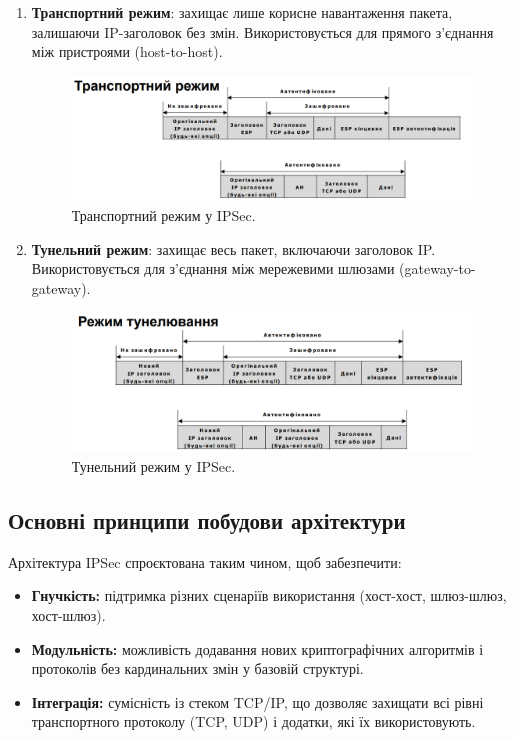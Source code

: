 \begin{enumerate}
    \item \textbf{Транспортний режим}: захищає лише корисне навантаження пакета, залишаючи IP-заголовок без змін. Використовується для прямого з’єднання між пристроями (host-to-host).

    \begin{figure}[h!]
        \centering
        \includegraphics[scale=0.35]{IMAGES/transport_mode.png}
        \caption{Транспортний режим у IPSec.}
        \label{fig_transport_mode}
    \end{figure}
    
    \item \textbf{Тунельний режим}: захищає весь пакет, включаючи заголовок IP. Використовується для з’єднання між мережевими шлюзами (gateway-to-gateway).

    \begin{figure}[h!]
        \centering
        \includegraphics[scale=0.35]{IMAGES/tunnel_mode.png}
        \caption{Тунельний режим у IPSec.}
        \label{fig_tunnel_mode}
    \end{figure}

\end{enumerate}

\subsection{Основні принципи побудови архітектури}
Архітектура IPSec спроєктована таким чином, щоб забезпечити:
\begin{itemize}
    \item \textbf{Гнучкість:} підтримка різних сценаріїв використання (хост-хост, шлюз-шлюз, хост-шлюз).
    \item \textbf{Модульність:} можливість додавання нових криптографічних алгоритмів і протоколів без кардинальних змін у базовій структурі.
    \item \textbf{Інтеграція:} сумісність із стеком TCP/IP, що дозволяє захищати всі рівні транспортного протоколу (TCP, UDP) і додатки, які їх використовують.
\end{itemize}

